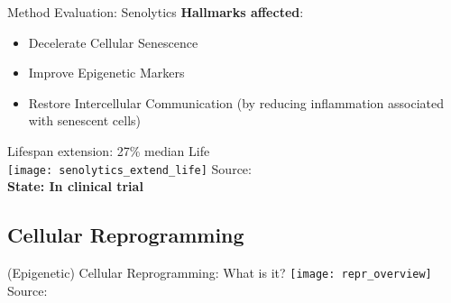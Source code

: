 \begin{frame}[c]{Method Evaluation: Senolytics}
    \textbf{Hallmarks affected}: \\
    \begin{itemize}[<+(1)->]
        \item Decelerate Cellular Senescence
        \item Improve Epigenetic Markers
        \item Restore Intercellular Communication (by reducing inflammation associated with senescent cells)
    \end{itemize}
    \pause
    Lifespan extension: 27\% median Life\\
    \texttt{[image: senolytics\_extend\_life]}
    Source: \cite{baker2016naturally} \\
    \pause
    \textbf{State: In clinical trial}
\end{frame}


\subsection{Cellular Reprogramming}

\begin{frame}[c]{(Epigenetic) Cellular Reprogramming: What is it?} 
    \texttt{[image: repr\_overview]} \\
    Source: \cite{ocampo2016vivo}
\end{frame}


